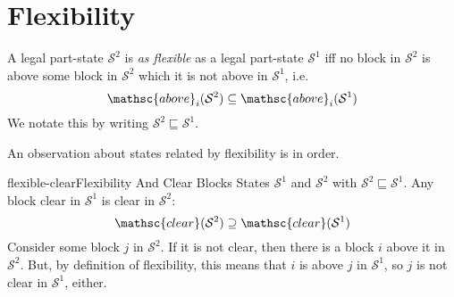 \documentclass{article}
\newcommand{\bstate}{{\mathcal{S}}}
\newcommand{\bclear}{{\mathsc{clear}}}
\newcommand{\babove}{{\mathsc{above}}}
\begin{document}
\section{Flexibility}

A legal part-state $\bstate^2$ is {\em as flexible} as
a legal part-state $\bstate^1$ iff no block in $\bstate^2$
is above some block in $\bstate^2$ which it is not above in
$\bstate^1$, i.e. $$
  \babove_i (\bstate^2) \subseteq \babove_i(\bstate^1)
$$
We notate this by writing $\bstate^2 \sqsubseteq \bstate^1$.

An observation about states related by flexibility is in order.
\begin{lemma}{flexible-clear}{Flexibility And Clear Blocks}
\given
States $\bstate^1$ and $\bstate^2$ with $\bstate^2 \sqsubseteq \bstate^1$.
\prove
Any block clear in $\bstate^1$ is clear in $\bstate^2$: $$
  \bclear(\bstate^2) \supseteq \bclear(\bstate^1)
$$
\proof
Consider some block $j$ in $\bstate^2$.  If it is not clear,
then there is a block $i$ above it in $\bstate^2$.  But,
by definition of flexibility, this means that $i$ is above $j$
in $\bstate^1$, so $j$ is not clear in $\bstate^1$, either.
\end{lemma}
\end{document}
